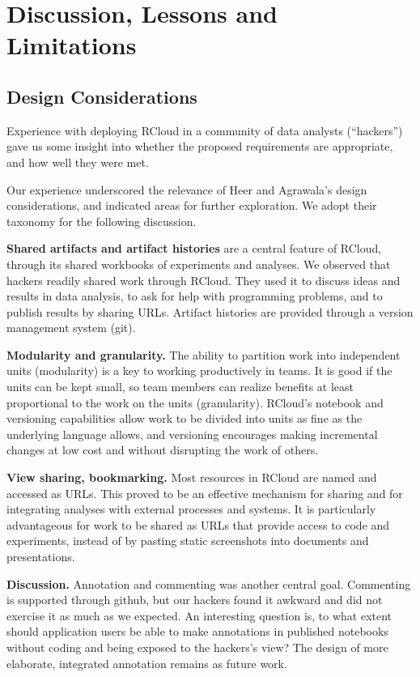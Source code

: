\section{Discussion, Lessons and Limitations}
\label{sec:discussion}

\subsection{Design Considerations}

Experience with deploying RCloud in a community of data analysts
(``hackers'') gave us some insight into whether the proposed
requirements are appropriate, and how well they were met.

Our experience underscored the relevance of Heer and Agrawala's design
considerations, and indicated areas for further exploration. We adopt
their taxonomy for the following discussion.

{\bf Shared artifacts and artifact histories} are a central feature
of RCloud, through its shared workbooks of experiments and analyses.
We observed that hackers readily shared work through RCloud. They
used it to discuss ideas and results in data analysis, to ask for help
with programming problems, and to publish results by sharing URLs.
Artifact histories are provided through a version management system (git).

{\bf Modularity and granularity.} The ability to partition work into
independent units (modularity) is a key to working productively in teams.
It is good if the units can be kept small, so team members can realize
benefits at least proportional to the work on the units (granularity).
RCloud's notebook and versioning capabilities allow work to be divided
into units as fine as the underlying language allows, and versioning
encourages making incremental changes at low cost and without disrupting
the work of others.

{\bf View sharing, bookmarking.} Most resources in RCloud are named
and accessed as URLs. This proved to be an effective mechanism for
sharing and for integrating analyses with external processes and systems.
It is particularly advantageous for work to be shared as URLs that
provide access to code and experiments, instead of by pasting static
screenshots into documents and presentations.

{\bf Discussion.} Annotation and commenting was another central goal.
Commenting is supported through github, but our hackers found it
awkward and did not exercise it as much as we expected.
An interesting question is, to what extent should application users
be able to make annotations in published notebooks without coding
and being exposed to the hackers's view? The design of
more elaborate, integrated annotation remains as future work.

